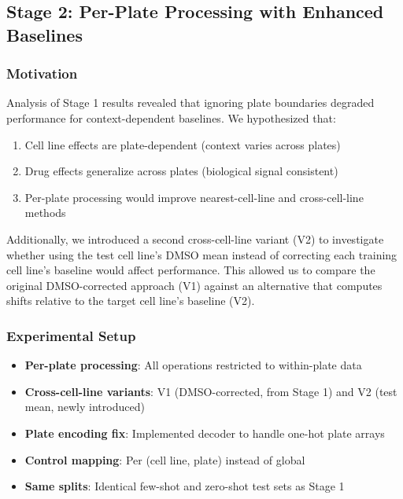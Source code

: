 \documentclass[conference]{IEEEtran}
\begin{document}
\subsection{Stage 2: Per-Plate Processing with Enhanced Baselines}

\subsubsection{Motivation}

Analysis of Stage 1 results revealed that ignoring plate boundaries degraded performance for context-dependent baselines. We hypothesized that:
\begin{enumerate}
    \item Cell line effects are plate-dependent (context varies across plates)
    \item Drug effects generalize across plates (biological signal consistent)
    \item Per-plate processing would improve nearest-cell-line and cross-cell-line methods
\end{enumerate}

Additionally, we introduced a second cross-cell-line variant (V2) to investigate whether using the test cell line's DMSO mean instead of correcting each training cell line's baseline would affect performance. This allowed us to compare the original DMSO-corrected approach (V1) against an alternative that computes shifts relative to the target cell line's baseline (V2).

\subsubsection{Experimental Setup}

\begin{itemize}
    \item \textbf{Per-plate processing}: All operations restricted to within-plate data
    \item \textbf{Cross-cell-line variants}: V1 (DMSO-corrected, from Stage 1) and V2 (test mean, newly introduced)
    \item \textbf{Plate encoding fix}: Implemented decoder to handle one-hot plate arrays
    \item \textbf{Control mapping}: Per (cell line, plate) instead of global
    \item \textbf{Same splits}: Identical few-shot and zero-shot test sets as Stage 1
\end{itemize}
\end{document}
